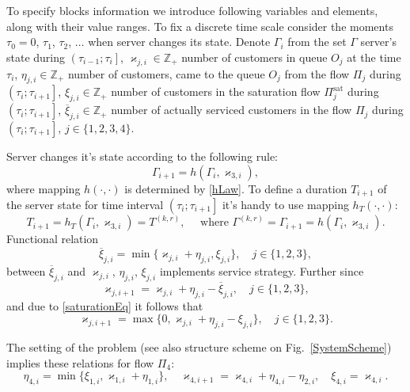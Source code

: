 \documentclass[10pt]{article}
\begin{document}
To specify blocks information we introduce following variables and elements, along with their value ranges. To fix a discrete time scale consider the moments $\tau_0=0$, $\tau_1$, $\tau_2$, $\ldots$ when server changes its state. Denote $\Gamma_i$ from the set $\Gamma$ server's state during $\left(\tau_{i-1};\tau_i\right]$, $\varkappa_{j,i} \in \mathbb{Z}_+ $ number of customers in queue $O_j$ at the time $\tau_i$, $\eta_{j,i} \in \mathbb{Z}_+$ number of customers, came to the queue $O_j$ from the flow $\Pi_j$ during $\left(\tau_{i};\tau_{i+1}\right]$, $\xi_{j,i} \in \mathbb{Z}_+$ number of customers in the saturation flow $\Pi^{\mathrm{\text{sat}}}_j$ during $\left(\tau_{i};\tau_{i+1}\right]$, $\overline{\xi}_{j,i}\in \mathbb{Z}_+$ number of actually serviced customers in the flow $\Pi_j$ during $\left(\tau_{i};\tau_{i+1}\right]$, $j\in \{1,2,3,4\}$.

Server changes it's state according to the following rule:
\begin{equation}
\Gamma_{i+1}=h(\Gamma_i,\varkappa_{3,i}),
\label{gammaFunc}
\end{equation}
where mapping $h(\cdot,\cdot)$ is determined by \eqref{hLaw}.
To define a duration $T_{i+1}$ of the server state for time interval $\left(\tau_{i};\tau_{i+1}\right]$ it's handy to use mapping $h_T(\cdot,\cdot)$:
\begin{equation*}
T_{i+1}=h_T(\Gamma_i,\varkappa_{3,i})= T^{(k,r)},\quad  \text{ where } \Gamma^{(k,r)}=\Gamma_{i+1}=h(\Gamma_i,\varkappa_{3,i}).
\end{equation*}
Functional relation
\begin{equation}
\overline{\xi}_{j,i}=\min\{\varkappa_{j,i}+\eta_{j,i},\xi_{j,i}\}, \quad j\in \{1,2,3\},
\label{saturationEq}
\end{equation}
between $\overline{\xi}_{j,i}$ and $\varkappa_{j,i}$, $\eta_{j,i}$, $\xi_{j,i}$ implements service strategy. Further since
\begin{equation*}
\varkappa_{j,i+1}=\varkappa_{j,i}+\eta_{j,i}-\overline{\xi}_{j,i}, \quad  j\in \{1,2,3\},
\end{equation*}
and due to \eqref{saturationEq} it follows that 
\begin{equation}
\varkappa_{j,i+1}=\max\{{0,\varkappa_{j,i}+\eta_{j,i}-\xi_{j,i}}\}, \quad j\in \{1,2,3\}.
\label{queuesFunc}
\end{equation}

The setting of the problem (see also structure scheme on Fig.~\ref{SystemScheme}) implies these relations for flow $\Pi_4$:
\begin{equation}
\eta_{4,i} = \min\{\xi_{1,i}, \varkappa_{1,i}+\eta_{1,i}\}, \quad \varkappa_{4,i+1}=\varkappa_{4,i}+\eta_{4,i}-\eta_{2,i}, \quad \xi_{4,i} = \varkappa_{4,i}.
\label{FourthFunc}
\end{equation}
\end{document}
